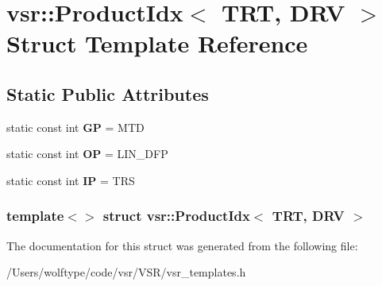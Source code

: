 \hypertarget{structvsr_1_1_product_idx_3_01_t_r_t_00_01_d_r_v_01_4}{\section{vsr\-:\-:Product\-Idx$<$ T\-R\-T, D\-R\-V $>$ Struct Template Reference}
\label{structvsr_1_1_product_idx_3_01_t_r_t_00_01_d_r_v_01_4}
}
\subsection*{Static Public Attributes}
\begin{DoxyCompactItemize}
\item 
\hypertarget{structvsr_1_1_product_idx_3_01_t_r_t_00_01_d_r_v_01_4_a1d07ca2f13eae4a704b3ddd8b24682a4}{static const int {\bfseries G\-P} = M\-T\-D}\label{structvsr_1_1_product_idx_3_01_t_r_t_00_01_d_r_v_01_4_a1d07ca2f13eae4a704b3ddd8b24682a4}

\item 
\hypertarget{structvsr_1_1_product_idx_3_01_t_r_t_00_01_d_r_v_01_4_a77664103adc364ec8e39856c5a8480b3}{static const int {\bfseries O\-P} = L\-I\-N\-\_\-\-D\-F\-P}\label{structvsr_1_1_product_idx_3_01_t_r_t_00_01_d_r_v_01_4_a77664103adc364ec8e39856c5a8480b3}

\item 
\hypertarget{structvsr_1_1_product_idx_3_01_t_r_t_00_01_d_r_v_01_4_a3d947caf46378a036e6dbe37b25a98fb}{static const int {\bfseries I\-P} = T\-R\-S}\label{structvsr_1_1_product_idx_3_01_t_r_t_00_01_d_r_v_01_4_a3d947caf46378a036e6dbe37b25a98fb}

\end{DoxyCompactItemize}
\subsubsection*{template$<$$>$ struct vsr\-::\-Product\-Idx$<$ T\-R\-T, D\-R\-V $>$}



The documentation for this struct was generated from the following file\-:\begin{DoxyCompactItemize}
\item 
/\-Users/wolftype/code/vsr/\-V\-S\-R/vsr\-\_\-templates.\-h\end{DoxyCompactItemize}
